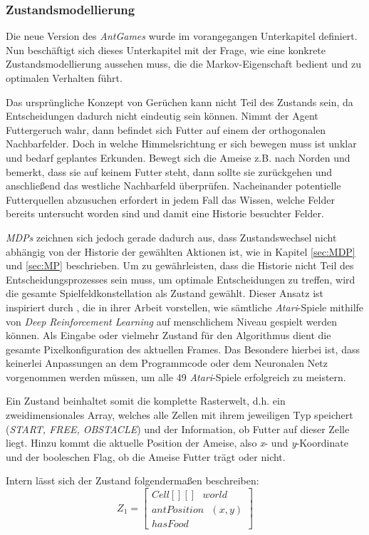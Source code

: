 \subsubsection{Zustandsmodellierung}
Die neue Version des \textit{AntGames} wurde im vorangegangen Unterkapitel definiert. Nun beschäftigt sich dieses Unterkapitel mit der Frage, wie eine konkrete Zustandsmodellierung aussehen muss, die die Markov-Eigenschaft bedient und zu optimalen Verhalten führt.
\par 
Das ursprüngliche Konzept von \glqq Gerüchen\grqq{} kann nicht Teil des Zustands sein, da Entscheidungen dadurch nicht eindeutig sein können. Nimmt der Agent Futtergeruch wahr, dann befindet sich Futter auf einem der orthogonalen Nachbarfelder. Doch in welche Himmelsrichtung er sich bewegen muss ist unklar und bedarf geplantes Erkunden. Bewegt sich die Ameise z.B. nach Norden und bemerkt, dass sie auf keinem Futter steht, dann sollte sie zurückgehen und anschließend das westliche Nachbarfeld überprüfen. Nacheinander potentielle Futterquellen abzusuchen erfordert in jedem Fall das Wissen, welche Felder bereits untersucht worden sind und damit eine Historie besuchter Felder.
\par 
\textit{MDPs} zeichnen sich jedoch gerade dadurch aus, dass Zustandswechsel nicht abhängig von der Historie der gewählten Aktionen ist, wie in Kapitel \ref{sec:MDP} und \ref{sec:MP} beschrieben. Um zu gewährleisten, dass die Historie nicht Teil des Entscheidungsprozesses sein muss, um optimale Entscheidungen zu treffen, wird die gesamte Spielfeldkonstellation als Zustand gewählt. Dieser Ansatz ist inspiriert durch \cite{dqn}, die in ihrer Arbeit vorstellen, wie sämtliche \textit{Atari}-Spiele mithilfe von \textit{Deep Reinforcement Learning} auf menschlichem Niveau gespielt werden können. Als Eingabe oder vielmehr Zustand für den Algorithmus dient die gesamte Pixelkonfiguration des aktuellen Frames. Das Besondere hierbei ist, dass keinerlei Anpassungen an dem Programmcode oder dem Neuronalen Netz vorgenommen werden müssen, um alle 49 \textit{Atari}-Spiele erfolgreich zu meistern.
\par 
Ein Zustand beinhaltet somit die komplette Rasterwelt, d.h. ein zweidimensionales Array, welches alle Zellen mit ihrem jeweiligen Typ speichert (\textit{START, FREE, OBSTACLE}) und der Information, ob Futter auf dieser Zelle liegt. Hinzu kommt die aktuelle Position der Ameise, also \textit{x}- und \textit{y}-Koordinate und der booleschen Flag, ob die Ameise Futter trägt oder nicht.
\par 
Intern lässt sich der Zustand folgendermaßen beschreiben:
\begin{equation}
Z_{1} =  \begin{bmatrix} Cell[][]\text{ }world\\
                         antPosition\text{ }(x,y) \\
                        hasFood  \end{bmatrix}
\end{equation}

